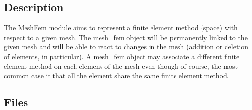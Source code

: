 \documentclass[a4paper,11pt,english]{sphinxmanual}
\begin{document}
\subsection{Description}
\label{\detokenize{project/libdesc_meshfem:description}}
The MeshFem module aims to represent a finite element method (space) with respect to a given mesh. The mesh\_fem object will be permanently linked to the given mesh and will be able to react to  changes in the mesh (addition or deletion of elements, in particular). A mesh\_fem object may associate a different finite element method on each element of the mesh even though of course, the most common case it that all the element share the same finite element method.


\subsection{Files}
\label{\detokenize{project/libdesc_meshfem:files}}
\end{document}

